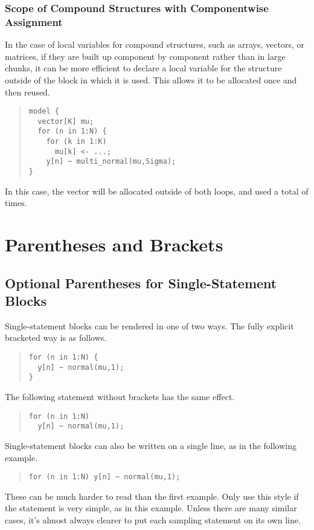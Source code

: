 \subsubsection{Scope of Compound Structures with Componentwise Assignment}

In the case of local variables for compound structures, such as
arrays, vectors, or matrices, if they are built up component by
component rather than in large chunks, it can be more efficient to
declare a local variable for the structure outside of the block
in which it is used.  This allows it to be allocated once and then
reused.
%
\begin{quote}
\begin{Verbatim}
model {
  vector[K] mu;
  for (n in 1:N) {
    for (k in 1:K) 
      mu[k] <- ...;
    y[n] ~ multi_normal(mu,Sigma);
}
\end{Verbatim}
\end{quote}
%
In this case, the vector  will be allocated
outside of both loops, and used a total of  times.

\section{Parentheses and Brackets}

\subsection{Optional Parentheses for Single-Statement Blocks}

Single-statement blocks can be rendered in one of two ways.  The fully
explicit bracketed way is as follows.
%
\begin{quote}
\begin{Verbatim}
for (n in 1:N) {
  y[n] ~ normal(mu,1);
}
\end{Verbatim}
\end{quote}
%
The following statement without brackets has the same effect.
%
\begin{quote}
\begin{Verbatim}  
for (n in 1:N)
  y[n] ~ normal(mu,1);
\end{Verbatim}
\end{quote}
%  
Single-statement blocks can also be written on a single line, as
in the following example.
%
\begin{quote}
\begin{Verbatim} 
for (n in 1:N) y[n] ~ normal(mu,1);
\end{Verbatim}
\end{quote}
%
These can be much harder to read than the first example. Only use this
style if the statement is very simple, as in this example.  Unless
there are many similar cases, it's almost always clearer to put
each sampling statement on its own line.

